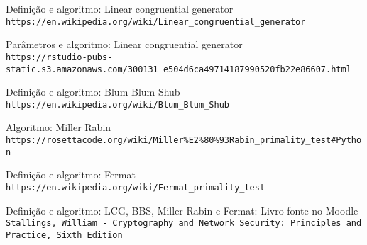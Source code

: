 \documentclass{article}
\begin{document}
\pagebreak

\begin{thebibliography}{5}

Definição e algoritmo: Linear congruential generator
\\\texttt{https://en.wikipedia.org/wiki/Linear\_congruential\_generator}

Parâmetros e algoritmo: Linear congruential generator
\\\texttt{https://rstudio-pubs-static.s3.amazonaws.com/300131\_e504d6ca49714187990520fb22e86607.html}

Definição e algoritmo: Blum Blum Shub
\\\texttt{https://en.wikipedia.org/wiki/Blum\_Blum\_Shub}

Algoritmo: Miller Rabin
\\\texttt{https://rosettacode.org/wiki/Miller\%E2\%80\%93Rabin\_primality\_test\#Python}

Definição e algoritmo: Fermat
\\\texttt{https://en.wikipedia.org/wiki/Fermat\_primality\_test}

Definição e algoritmo: LCG, BBS, Miller Rabin e Fermat: Livro fonte no Moodle
\\\texttt{Stallings, William - Cryptography and Network Security: Principles and Practice, Sixth Edition}

\end{thebibliography}
\end{document}
